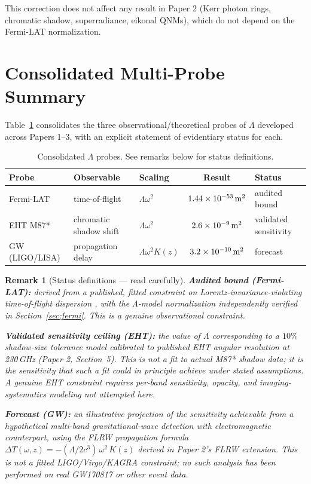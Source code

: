 \documentclass[12pt,a4paper]{article}
\newtheorem{remark}{Remark}
\begin{document}
This correction does not affect any result in Paper 2 (Kerr photon
rings, chromatic shadow, superradiance, eikonal QNMs), which do not
depend on the Fermi-LAT normalization.

\section{Consolidated Multi-Probe Summary}
\label{sec:consolidated}

Table~\ref{tab:probes} consolidates the three observational/theoretical
probes of $\Lambda$ developed across Papers 1--3, with an explicit
statement of evidentiary status for each.

\begin{table}[h]
\centering
\caption{Consolidated $\Lambda$ probes. See remarks below for status
definitions.}
\label{tab:probes}
\begin{tabular}{lllcl}
\toprule
Probe & Observable & Scaling & Result & Status \\
\midrule
Fermi-LAT     & time-of-flight            & $\Lambda\omega^2$        & $1.44\times10^{-53}\,{\rm m^2}$ & audited bound \\
EHT M87*      & chromatic shadow shift    & $\Lambda\omega^2$        & $2.6\times10^{-9}\,{\rm m^2}$   & validated sensitivity \\
GW (LIGO/LISA)& propagation delay         & $\Lambda\omega^2 K(z)$   & $3.2\times10^{-10}\,{\rm m^2}$  & forecast \\
\bottomrule
\end{tabular}
\end{table}

\begin{remark}[Status definitions --- read carefully]
\textbf{Audited bound (Fermi-LAT):} derived from a published, fitted
constraint on Lorentz-invariance-violating time-of-flight dispersion
\citep{Abdo2009}, with the $\Lambda$-model normalization independently
verified in Section~\ref{sec:fermi}. This is a genuine observational
constraint.

\textbf{Validated sensitivity ceiling (EHT):} the value of $\Lambda$
corresponding to a $10\%$ shadow-size tolerance model calibrated to
published EHT angular resolution at 230\,GHz (Paper 2,
Section~5). This is \emph{not} a fit to actual M87* shadow data; it is
the sensitivity that such a fit \emph{could in principle achieve} under
stated assumptions. A genuine EHT constraint requires per-band
sensitivity, opacity, and imaging-systematics modeling not attempted
here.

\textbf{Forecast (GW):} an illustrative projection of the sensitivity
achievable from a hypothetical multi-band gravitational-wave detection
with electromagnetic counterpart, using the FLRW propagation formula
$\Delta T(\omega,z)=-(\Lambda/2c^3)\,\omega^2\,K(z)$ derived in
Paper 2's FLRW extension. This is \emph{not} a fitted LIGO/Virgo/KAGRA
constraint; no such analysis has been performed on real GW170817 or
other event data.
\end{remark}
\end{document}
